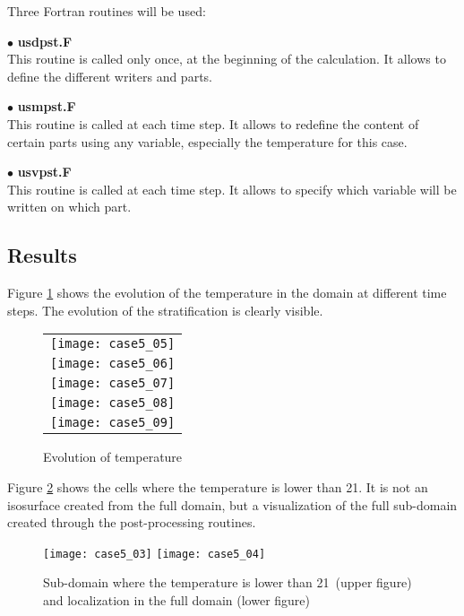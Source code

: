Three Fortran routines will be used:

$\bullet$ {\bfseries usdpst.F}\\
This routine is called only once, at the beginning of the calculation. It allows
to define the different writers and parts.

$\bullet$ {\bfseries usmpst.F}\\
This routine is called at each time step. It allows to redefine the content of
certain parts using any variable, especially the temperature for this case.

$\bullet$ {\bfseries usvpst.F}\\
This routine is called at each time step. It allows to specify which variable
will be written on which part.


        \subsection{Results}

Figure \ref{fige2_e5} shows the evolution of the temperature in the domain at
different time steps. The evolution of the stratification is clearly visible.


\begin{figure}
\begin{center}
\begin{tabular}{c}
\texttt{[image: case5\_05]} \\
\texttt{[image: case5\_06]} \\
\texttt{[image: case5\_07]} \\
\texttt{[image: case5\_08]} \\
\texttt{[image: case5\_09]} \\
\end{tabular}
\caption{Evolution of temperature}
\label{fige2_e5}
\end{center}
\end{figure}



Figure \ref{fige4_e5} shows the cells where the temperature
is lower than 21\degresC. It is not an isosurface created from the full domain,
but a visualization of the full sub-domain created through the post-processing
routines.

\begin{figure}[h!]
\begin{center}
\texttt{[image: case5\_03]}
\texttt{[image: case5\_04]}
\caption{Sub-domain where the temperature is lower than 21\degresC\ (upper figure)
and localization in the full domain (lower figure)}
\label{fige4_e5}
\end{center}
\end{figure}
